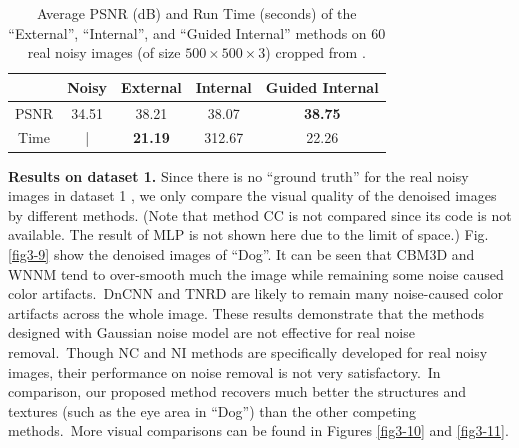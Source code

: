 \begin{table}
\caption{Average PSNR (dB) and Run Time (seconds) of the ``External'', ``Internal'', and ``Guided Internal'' methods on 60 real noisy images (of size $500\times500\times3$) cropped from \cite{crosschannel2016}.}

\label{tab3-1}
\begin{center}
\renewcommand\arraystretch{1}
\begin{tabular}{|c||c|c|c|c|}
\hline
 & \small\textbf{Noisy} &\small \textbf{External} & \small\textbf{Internal} & \small\textbf{Guided Internal}  
\\
\hline
PSNR & 34.51 & 38.21 & 38.07 & \textbf{38.75} 
\\
\hline
Time & | &  \textbf{21.19}  & 312.67 & 22.26
\\
\hline
\end{tabular}
\end{center}
\vspace{-3mm}
\end{table}

\textbf{Results on dataset 1.}
Since there is no ``ground truth'' for the real noisy images in  dataset 1 \cite{ncwebsite}, we only compare the visual quality of the denoised images by different methods. (Note that method CC \cite{crosschannel2016} is not compared since its code is not available. The result of MLP is not shown here due to the limit of space.) Fig. \ref{fig3-9} show the denoised images of ``Dog''. It can be seen that CBM3D and WNNM tend to over-smooth much the image while remaining some noise caused color artifacts.\ DnCNN and TNRD are likely to remain many noise-caused color artifacts across the whole image. These results demonstrate that the methods designed with Gaussian noise model are not effective for real noise removal.\ Though NC and NI methods are specifically developed for real noisy images, their performance on noise removal is not very satisfactory.\ In comparison, our proposed method recovers much better the structures and textures (such as the eye area in ``Dog'') than the other competing methods.\ More visual comparisons can be found in Figures \ref{fig3-10} and \ref{fig3-11}.



